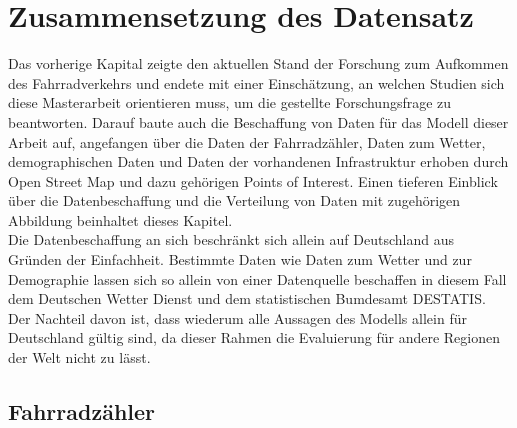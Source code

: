 \documentclass[a4paper,12pt]{thesis}
\begin{document}
\chapter{Zusammensetzung des Datensatz}

Das vorherige Kapital zeigte den aktuellen Stand der Forschung zum Aufkommen des Fahrradverkehrs und endete mit einer Einschätzung, an welchen Studien sich diese Masterarbeit orientieren muss, um die gestellte Forschungsfrage zu beantworten. Darauf baute auch die Beschaffung von Daten für das Modell dieser Arbeit auf, angefangen über die Daten der Fahrradzähler, Daten zum Wetter, demographischen Daten und Daten der vorhandenen Infrastruktur erhoben durch Open Street Map und dazu gehörigen Points of Interest. Einen tieferen Einblick über die Datenbeschaffung und die Verteilung von Daten mit zugehörigen Abbildung beinhaltet dieses Kapitel.\\
Die Datenbeschaffung an sich beschränkt sich allein auf Deutschland aus Gründen der Einfachheit. Bestimmte Daten wie Daten zum Wetter und zur Demographie lassen sich so allein von einer Datenquelle beschaffen in diesem Fall dem Deutschen Wetter Dienst und dem statistischen Bumdesamt DESTATIS. Der Nachteil davon ist, dass wiederum alle Aussagen des Modells allein für Deutschland gültig sind, da dieser Rahmen die Evaluierung für andere Regionen der Welt nicht zu lässt.

\section{Fahrradzähler}
\end{document}
